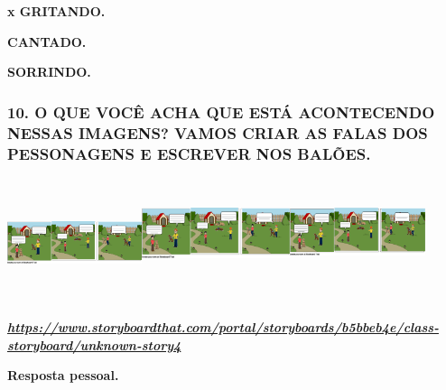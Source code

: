 \textbf{x GRITANDO. }

\textbf{CANTADO.}

\textbf{SORRINDO.}

\subsubsection[10. O QUE VOCÊ ACHA QUE ESTÁ ACONTECENDO NESSAS IMAGENS?
VAMOS CRIAR AS FALAS DOS PESSONAGENS E ESCREVER NOS
BALÕES.]{\texorpdfstring{10. O QUE VOCÊ ACHA QUE ESTÁ ACONTECENDO NESSAS
IMAGENS? VAMOS CRIAR AS FALAS DOS PESSONAGENS E ESCREVER NOS
BALÕES.\protect\includegraphics[width=1.55139in,height=1.32153in]{media/image177.png}\protect\includegraphics[width=1.70417in,height=1.53958in]{media/image178.png}\protect\includegraphics[width=1.56667in,height=1.56736in]{media/image179.png}}{10. O QUE VOCÊ ACHA QUE ESTÁ ACONTECENDO NESSAS IMAGENS? VAMOS CRIAR AS FALAS DOS PESSONAGENS E ESCREVER NOS BALÕES.}}\label{o-que-vocuxea-acha-que-estuxe1-acontecendo-nessas-imagens-vamos-criar-as-falas-dos-pessonagens-e-escrever-nos-baluxf5es.}

\href{https://www.storyboardthat.com/portal/storyboards/b5bbeb4e/class-storyboard/unknown-story4}{\textbf{\emph{https://www.storyboardthat.com/portal/storyboards/b5bbeb4e/class-storyboard/unknown-story4}}}

\textbf{Resposta pessoal.}

